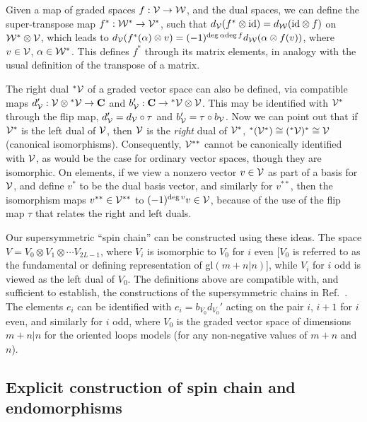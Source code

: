 \documentclass[twocolumn,floats,pra]{revtex4}
\begin{document}
Given a map of graded spaces $f:{\cal V}\to{\cal W}$, and the dual
spaces, we can define the super-transpose map $f^*:{\cal
W}^*\to{\cal V}^*$, such that $d_{\cal V}(f^*\otimes{\rm
id})=d_{\cal W}({\rm id}\otimes f)$ on ${\cal W}^*\otimes {\cal
V}$, which leads to $d_{\cal V}(f^*(\alpha)\otimes v)=(-1)^{{\rm
deg}\,\alpha{\rm deg}\, f} d_{\cal W}(\alpha\otimes f(v))$, where
$v\in{\cal V}$, $\alpha\in {\cal W}^*$. This defines $f^*$ through
its matrix elements, in analogy with the usual definition of the
transpose of a matrix.

The right dual $^*{\cal V}$ of a graded vector space can also be
defined, via compatible maps $d_{\cal V}':{\cal V}\otimes{^*{\cal
V}}\to{\bf C}$ and $b_{\cal V}':{\bf C}\to{^*{\cal V}}\otimes{\cal
V}$. This may be identified with ${\cal V}^*$ through the flip
map, $d_{\cal V}'=d_{\cal V}\circ\tau$ and $b_{\cal V}'=\tau\circ
b_{\cal V}$. Now we can point out that if ${\cal V}^*$ is the left
dual of $\cal V$, then $\cal V$ is the {\em right} dual of ${\cal
V}^*$, $^*({\cal V}^*)\cong (^*{\cal V})^*\cong{\cal V}$
(canonical isomorphisms). Consequently, ${\cal V}^{**}$ cannot be
canonically identified with $\cal V$, as would be the case for
ordinary vector spaces, though they are isomorphic. On elements,
if we view a nonzero vector $v\in {\cal V}$ as part of a basis for
${\cal V}$, and define $v^*$ to be the dual basis vector, and
similarly for $v^{**}$, then the isomorphism maps $v^{**}\in{\cal
V}^{**}$ to $(-1)^{{\rm deg}\,v}v\in{\cal V}$, because of the use
of the flip map $\tau$ that relates the right and left duals.

Our supersymmetric ``spin chain''  can be constructed using these
ideas. The space $V=V_0\otimes V_1\otimes\cdots V_{2L-1}$, where
$V_i$ is isomorphic to $V_0$ for $i$ even [$V_0$ is referred to as
the fundamental or defining representation of gl$(m+n|n)$], while
$V_i$ for $i$ odd is viewed as the left dual of $V_0$. The
definitions above are compatible with, and sufficient to
establish, the constructions of the supersymmetric chains in Ref.\
\cite{rs}. The elements $e_i$ can be identified with
$e_i=b_{V_0}d_{V_0}'$ acting on the pair $i$, $i+1$ for $i$ even,
and similarly for $i$ odd, where $V_0$ is the graded vector space
of dimensions $m+n|n$ for the oriented loops models (for any
non-negative values of $m+n$ and $n$).

\subsection{Explicit construction of spin chain and endomorphisms}
\end{document}

